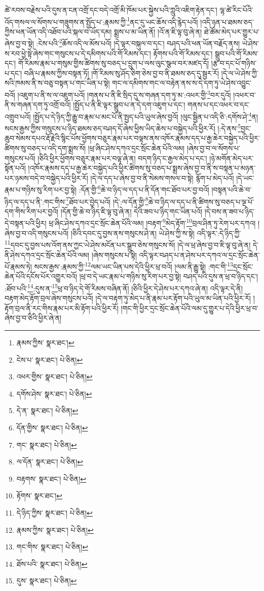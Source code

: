 ཚེ་རབས་བརྗེས་པའི་དུས་ན་ངན་འགྲོ་དང་བདེ་འགྲོ་མི་ཁོམ་པར་སྐྱེས་པའི་ཀླུའི་འཇིག་རྟེན་དང་། ལྷ་ཚེ་རིང་པོའི་འོད་གསལ་ལ་སོགས་པ་གཟུགས་ན་སྤྱོད་པ་:རྣམས་ཀྱི་\footnote{རྣམས་ཀྱིས་  སྣར་ཐང་། }ནང་དུ་ཡང་ཆོས་འདི་རྙེད་པའོ། །འདི་ཉན་པ་ཐམས་ཅད་ཀྱིས་ཕན་ཡོན་འདི་འཐོབ་པའི་སྐལ་བ་ཡོད་དམ། སྨྲས་པ་མ་ཡིན་ནོ། །འོ་ན་ཇི་ལྟ་བུ་ཞེ་ན། ཐེ་ཚོམ་མེད་པར་གྱུར་པ་ཞེས་བྱ་བ་སྟེ། :ངེས་པའི་\footnote{ངེས་པ་  སྣར་ཐང་།  པེ་ཅིན། }ཆོས་འདི་ལ་མོས་པའོ། །དེ་ལྟར་བསྐུལ་བ་དང་། བཤད་པའི་ཕན་ཡོན་བརྗོད་ནས། ཡེ་ཤེས་ས་རབ་ཕྱེ་སྟེ་ཞེས་གང་གསུངས་པ་དེ་དམིགས་པའི་གོ་རིམས་དང་། རྟོགས་པའི་གོ་རིམས་དང་། སྒྲུབ་པའི་གོ་རིམས་དང་། གོ་རིམས་རྣམ་པ་གསུམ་གྱིས་ཚིགས་སུ་བཅད་པ་དྲུག་པ་ལས་ལུང་སྩལ་བར་མཛད་དོ། །རྩ་བ་དང་པོ་གཉིས་པ་དང་། བཞི་པ་རྣམས་ཀྱིས་བསྟན་ཏོ། །གོ་རིམས་སུ་ཤོད་ཅིག་ཅེས་བྱ་བ་ནི་ཐམས་ཅད་དུ་སྦྱར་རོ། །དེ་ལ་ཡེ་ཤེས་ཀྱི་སའི་ཁམས་ནི་ས་བཅུ་བསྟན་པ་གང་ཡིན་པ་སྟེ། གང་ལ་དམིགས་གང་ལ་བརྟེན་ནས་ས་དེ་དག་ཏུ་ཡེ་ཤེས་འབྱུང་བའོ། །འཇུག་པ་ནི་ས་ལ་འཇུག་པའོ། །གནས་པ་ནི་ཇི་སྲིད་དུ་ས་གཞན་དག་ཏུ་མ་:འཕར་གྱི་\footnote{འཕར་གྱིས་  སྣར་ཐང་།  པེ་ཅིན། }བར་དུའོ། །འཕར་བ་ནི་ས་གཞན་དག་ཏུ་འགྲོ་བའོ། །སྤྱོད་པ་ནི་ཇི་ལྟར་སྒྲུབ་པ་ན་དེ་དག་འཇུག་པ་དང་། གནས་པ་དང་འཕར་བ་དང་འགྲུབ་པའོ། །སྤྱོད་པ་དེ་ཉིད་ཀྱི་རྒྱུ་བ་རྣམ་པ་མང་པོ་ནི་སྤྱད་པའི་ཡུལ་ཞེས་བྱའོ། །ལུང་སྦྱིན་པ་འདི་ཅི་:དགོས་ཤེ་\footnote{དགོས་ཤེས་  སྣར་ཐང་།  པེ་ཅིན། }ན། སངས་རྒྱས་ཀྱིས་གསུངས་པ་ཉིད་ཐམས་ཅད་བཤད་དོ་ཞེས་ཕྱིས་ཡིད་ཆེས་པ་བསྐྱེད་པའི་ཕྱིར་རོ། །:དེ་ནས་\footnote{དེ་ན་  སྣར་ཐང་།  པེ་ཅིན། }བྱང་ཆུབ་སེམས་དཔའ་རྡོ་རྗེའི་སྙིང་པོས་ཕྱོགས་བཅུར་རྣམ་པར་བལྟས་ནས་འཁོར་རྣམས་དད་པ་རྒྱ་ཆེར་བསྐྱེད་པའི་ཕྱིར་ཚིགས་སུ་བཅད་པ་འདི་དག་སྨྲས་སོ། །ཕྲ་ཞིང་ཤེས་དཀའ་དྲང་སྲོང་ཆེན་པོའི་ལམ། །ཞེས་བྱ་བ་ལ་སོགས་པ་གསུངས་པའོ། །ཅིའི་ཕྱིར་ཕྱོགས་བཅུར་རྣམ་པར་བལྟ་ཞེ་ན། བདག་ཉིད་ང་རྒྱལ་མེད་པ་དང་། །ཉེ་མགོན་མེད་པར་སྟོན་པའོ། །འཁོར་རྣམས་དད་པ་རྒྱ་ཆེར་བསྐྱེད་པའི་ཕྱིར་ཚིགས་སུ་བཅད་པ་སྨྲས་ཞེས་བྱ་བ་ནི་ས་བསྟན་པ་མཉན་པར་ཉམས་བདེ་བ་བསྐྱེད་པའི་ཕྱིར་རོ། །དེ་ལ་དད་པ་ཞེས་བྱ་བ་ནི་སེམས་གསལ་བ་སྟེ། རྙོག་པ་མེད་པའོ། །དེ་ཡང་རྣམ་པ་གཉིས་སུ་རིག་པར་བྱ་སྟེ། :དོན་གྱི་\footnote{དོན་གྱིས་  སྣར་ཐང་།  པེ་ཅིན། }ཆེ་བ་ཉིད་ལ་དད་པ་ནི་དོན་གང་ཐོབ་པར་བྱ་བའོ། །བསྟན་པའི་ཆེ་བ་ཉིད་ལ་དད་པ་ནི་:གང་གིས་\footnote{གང་  སྣར་ཐང་།  པེ་ཅིན། }ཐོབ་པར་བྱེད་པའོ། །དེ་:ལ་དོན་གྱི་\footnote{ལ་དོན་  སྣར་ཐང་།  པེ་ཅིན། }ཆེ་བ་ཉིད་ལ་དད་པ་ནི་ཚིགས་སུ་བཅད་པ་ལྔ་པོ་དག་གིས་རིག་པར་བྱའོ། །དོན་གྱི་ཆེ་བ་ཉིད་ཇི་ལྟ་བུ་ཞེ་ན། དེའི་ཟབ་པ་ཉིད་གང་ཡིན་པའོ། །དེ་བས་ན་ཟབ་པ་ཉིད་དེ་བསྟན་པའི་ཕྱིར། ཕྲ་ཞིང་ཤེས་དཀའ་དྲང་སྲོང་ཆེན་པོའི་ལམ། །བརྟག་\footnote{བརྟགས་  སྣར་ཐང་།  པེ་ཅིན། }མེད་རྟོག་\footnote{རྟོགས་  སྣར་ཐང་། }བྲལ་ཤིན་ཏུ་རེག་པར་དཀའ། །ཞེས་བྱ་བ་འདི་གསུངས་པའོ། །ཅིའི་དབང་དུ་བྱས་ནས་གསུངས་ཤེ་ན། ཡེ་ཤེས་ཀྱི་ས་སྟེ། འདི་ལྟར་:དེ་ཉིད་ཀྱི་\footnote{དེ་ཉིད་ཀྱིས་  སྣར་ཐང་།  པེ་ཅིན། }དབང་དུ་བྱས་པས་འོག་ནས་ཀྱང་ཡེ་ཤེས་མངོན་པར་སྒྲུབ་ཅེས་གསུངས་སོ། །དེ་ལ་ཕྲ་ཞེས་བྱ་བ་ཇི་ལྟ་བུ་ཞེ་ན། དེ་ནི་ཤེས་དཀའ་དྲང་སྲོང་ཆེན་པོའི་ལམ། །ཞེས་གསུངས་པ་སྟེ། འདི་ལྟར་བཤད་པ་ན་ཤེས་པར་དཀའ་ལ་དྲང་སྲོང་ཆེན་པོ་རྣམས་ཏེ། སངས་རྒྱས་:རྣམས་ཀྱི་\footnote{རྣམས་ཀྱིས་  སྣར་ཐང་།  པེ་ཅིན། }ལམ་ཡང་ཡིན་པས་དེའི་ཕྱིར་ཕྲ་བའོ། །ལམ་ནི་རྒྱུ་སྟེ། :གང་གི་\footnote{གང་གིས་  སྣར་ཐང་།  པེ་ཅིན། }དྲང་སྲོང་ཆེན་པོའི་དངོས་པོར་འགྱུར་བའོ། །ཕྲ་བ་དེ་ཡང་རྣམ་པ་གཉིས་སུ་རིག་པར་བྱ་སྟེ། བཤད་པའི་དུས་ན་ཕྲ་བ་ཉིད་དང་། :ཐོབ་པའི་\footnote{ཐོས་པའི་  སྣར་ཐང་།  པེ་ཅིན། }:དུས་ན་\footnote{དུས་  སྣར་ཐང་།  པེ་ཅིན། }ཕྲ་བ་ཉིད་དེ་གོ་རིམས་བཞིན་ནོ། །ཅིའི་ཕྱིར་དེ་ཤེས་པར་དཀའ་ཞེ་ན། འདི་ལྟར་དེ་ནི། བརྟག་མེད་རྟོག་བྲལ་ཞེས་གསུངས་པའོ། །དེ་ལ་བརྟག་ཏུ་མེད་པ་ནི་རྣམ་པར་རྟོག་པའི་ཡུལ་མ་ཡིན་པའི་ཕྱིར་རོ། །རྟོག་བྲལ་ནི་རང་གིས་རྣམ་པར་མི་རྟོག་པའི་ཕྱིར་རོ། །གང་གི་ཕྱིར་དྲང་སྲོང་ཆེན་པོའི་ལམ་དུ་གྱུར་པ་དེའི་ཕྱིར་ཕྲ་བ་ཞེས་བྱ་བ་ཅིའི་ཕྱིར་ཞེ་ན། 